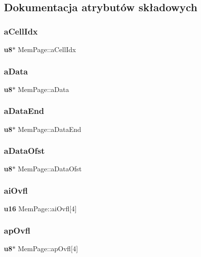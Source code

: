 \subsection{Dokumentacja atrybutów składowych}
\mbox{\label{struct_mem_page_a6f391f110e68ede6e5234b4e9f678f99}} 
\subsubsection{aCellIdx}
{\footnotesize\ttfamily \textbf{ u8}$\ast$ Mem\+Page\+::a\+Cell\+Idx}

\mbox{\label{struct_mem_page_a2d873eff563d2208be0c24959140a4b0}} 
\subsubsection{aData}
{\footnotesize\ttfamily \textbf{ u8}$\ast$ Mem\+Page\+::a\+Data}

\mbox{\label{struct_mem_page_ab5d2ecb95a84eaf4bd0ccef536bac6d7}} 
\subsubsection{aDataEnd}
{\footnotesize\ttfamily \textbf{ u8}$\ast$ Mem\+Page\+::a\+Data\+End}

\mbox{\label{struct_mem_page_a0af9fdf5075be66cd5a4932b81072185}} 
\subsubsection{aDataOfst}
{\footnotesize\ttfamily \textbf{ u8}$\ast$ Mem\+Page\+::a\+Data\+Ofst}

\mbox{\label{struct_mem_page_a4301e48076cae9e898a93d89c252a1d7}} 
\subsubsection{aiOvfl}
{\footnotesize\ttfamily \textbf{ u16} Mem\+Page\+::ai\+Ovfl[4]}

\mbox{\label{struct_mem_page_a056ebeebc2fd0995e5aff71feee72a68}} 
\subsubsection{apOvfl}
{\footnotesize\ttfamily \textbf{ u8}$\ast$ Mem\+Page\+::ap\+Ovfl[4]}

